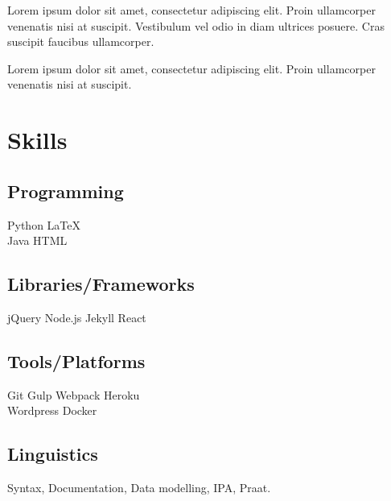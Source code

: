 \documentclass[]{plushcv}
\begin{document}
\begin{minipage}[t]{0.70\textwidth}
\begin{tightemize}
\item Lorem ipsum dolor sit amet, consectetur adipiscing elit. Proin ullamcorper venenatis nisi at suscipit. Vestibulum vel odio in diam ultrices posuere. Cras suscipit faucibus ullamcorper. 
\item Lorem ipsum dolor sit amet, consectetur adipiscing elit. Proin ullamcorper venenatis nisi at suscipit.
\end{tightemize}
\sectionsep

%
%

\end{minipage} 
\hfill
\begin{minipage}[t]{0.25\textwidth} 


\section{Skills}
\subsection{Programming}
\sectionsep
{}
Python \textbullet{} LaTeX  \\
\sectionsep
{}
Java \textbullet{}  HTML \\
\sectionsep
\sectionsep
\subsection{Libraries/Frameworks}
\sectionsep
jQuery \textbullet{} Node.js \textbullet{} Jekyll \textbullet{} React \\
\sectionsep
\sectionsep
\subsection{Tools/Platforms}
\sectionsep
Git \textbullet{} Gulp \textbullet{} Webpack \textbullet{} Heroku    \\ Wordpress \textbullet{} Docker \\
\sectionsep
\sectionsep
\subsection{Linguistics}
\sectionsep
Syntax, Documentation, Data modelling, IPA, Praat.
\sectionsep


\end{minipage}
\end{document}
